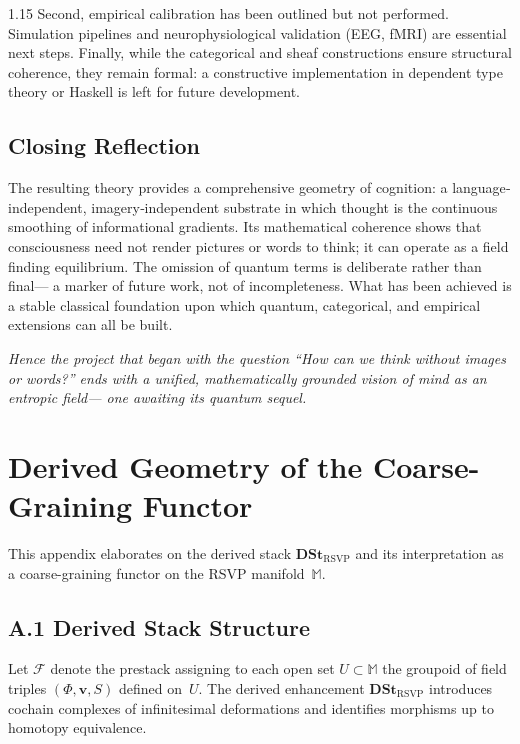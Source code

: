 \documentclass[12pt,a4paper]{article}
\begin{document}
\begin{spacing}{1.15}
Second, empirical calibration has been outlined but not performed.
Simulation pipelines and neurophysiological validation (EEG, fMRI)
are essential next steps.
Finally, while the categorical and sheaf constructions ensure
structural coherence, they remain formal: a constructive implementation
in dependent type theory or Haskell is left for future development.

\subsection{Closing Reflection}

The resulting theory provides a comprehensive geometry of cognition:
a language‐independent, imagery‐independent substrate in which
thought is the continuous smoothing of informational gradients.
Its mathematical coherence shows that consciousness need not render
pictures or words to think; it can operate as a field finding equilibrium.
The omission of quantum terms is deliberate rather than final—
a marker of future work, not of incompleteness.
What has been achieved is a stable classical foundation upon which
quantum, categorical, and empirical extensions can all be built.

\bigskip
\noindent
\emph{Hence the project that began with the question
“How can we think without images or words?” ends with a unified,
mathematically grounded vision of mind as an entropic field—
one awaiting its quantum sequel.}


\newpage
\appendix

\section{Derived Geometry of the Coarse-Graining Functor}

This appendix elaborates on the derived stack
$\mathbf{DSt}_{\text{RSVP}}$ and its interpretation as a
coarse-graining functor on the RSVP manifold~$\mathbb{M}$.

\subsection*{A.1 Derived Stack Structure}

Let $\mathcal{F}$ denote the prestack assigning to each open set
$U\subset\mathbb{M}$ the groupoid of field triples
$(\Phi,\mathbf{v},S)$ defined on~$U$.
The derived enhancement
$\mathbf{DSt}_{\text{RSVP}}$ introduces cochain complexes of
infinitesimal deformations and identifies morphisms up to
homotopy equivalence.


\end{spacing}
\end{document}

